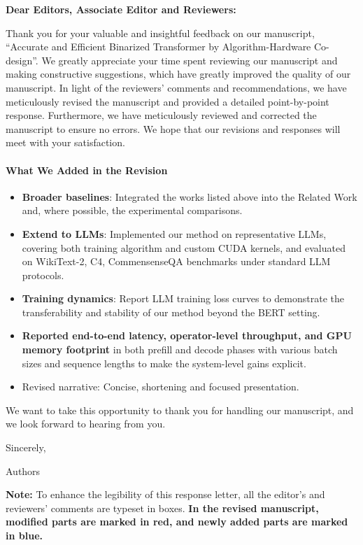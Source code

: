 \thispagestyle{empty}
\clearpage
{}
{}

\noindent \textbf{Dear Editors, Associate Editor and Reviewers:}

Thank you for your valuable and insightful feedback on our manuscript, ``Accurate and Efficient Binarized Transformer by Algorithm-Hardware Co-design''. We greatly appreciate your time spent reviewing our manuscript and making constructive suggestions, which have greatly improved the quality of our manuscript. In light of the reviewers' comments and recommendations, we have meticulously revised the manuscript and provided a detailed point-by-point response. Furthermore, we have meticulously reviewed and corrected the manuscript to ensure no errors. We hope that our revisions and responses will meet with your satisfaction.


\paragraph{What We Added in the Revision}

\begin{itemize}
    \item \textbf{Broader baselines}: Integrated the works listed above into the Related Work and, where possible, the experimental comparisons.
    
    \item \textbf{Extend to LLMs}: Implemented our method on representative LLMs, covering both training algorithm and custom CUDA kernels, and evaluated on WikiText-2, C4, CommensenseQA benchmarks under standard LLM protocols.

    \item \textbf{Training dynamics}: Report LLM training loss curves to demonstrate the transferability and stability of our method beyond the BERT setting.

    \item \textbf{Reported end-to-end latency, operator-level throughput, and GPU memory footprint} in both prefill and decode phases with various batch sizes and sequence lengths to make the system-level gains explicit. 

    \item Revised narrative: Concise, shortening and focused presentation. 
\end{itemize}


We want to take this opportunity to thank you for handling our manuscript, and we look forward to hearing from you.

\vspace{8em}

\noindent Sincerely,

\noindent Authors

\vfill
\textbf{Note:} To enhance the legibility of this response letter, all the editor's and reviewers' comments are typeset in boxes. \textbf{In the revised manuscript, modified parts are marked in red, and newly added parts are marked in blue.}